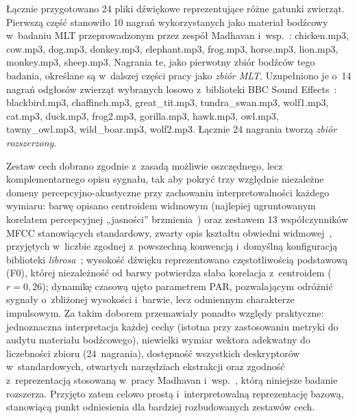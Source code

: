 \documentclass{article}
\begin{document}
Łącznie przygotowano 24 pliki dźwiękowe reprezentujące różne gatunki zwierząt. Pierwszą część stanowiło 10 nagrań wykorzystanych jako materiał bodźcowy w~badaniu MLT przeprowadzonym przez zespół Madhavan i~wsp.~\cite{MadhavanWrobel2024MLT}: chicken.mp3, cow.mp3, dog.mp3, donkey.mp3, elephant.mp3, frog.mp3, horse.mp3, lion.mp3, monkey.mp3, sheep.mp3. Nagrania te, jako pierwotny zbiór bodźców tego badania, określane są w~dalszej części pracy jako \textit{zbiór MLT}. Uzupełniono je o~14 nagrań odgłosów zwierząt wybranych losowo z~biblioteki BBC Sound Effects~\cite{bbcrewind_soundeffects}: blackbird.mp3, chaffinch.mp3, great\_tit.mp3, tundra\_swan.mp3, wolf1.mp3, cat.mp3, duck.mp3, frog2.mp3, gorilla.mp3, hawk.mp3, owl.mp3, tawny\_owl.mp3, wild\_boar.mp3, wolf2.mp3. Łącznie 24 nagrania tworzą \textit{zbiór rozszerzony}.

Zestaw cech dobrano zgodnie z~zasadą możliwie oszczędnego, lecz komplementarnego opisu sygnału, tak aby pokryć trzy względnie niezależne domeny percepcyjno-akustyczne przy zachowaniu interpretowalności każdego wymiaru: barwę opisano centroidem widmowym (najlepiej ugruntowanym korelatem percepcyjnej „jasności” brzmienia~\cite{Grey1977Timbre,Lakatos2000Timbre,saitis2020brightness}) oraz zestawem 13 współczynników MFCC stanowiących standardowy, zwarty opis kształtu obwiedni widmowej~\cite{Peeters2011TimbreToolbox,Siedenburg2017TimbreSimilarity,DeCamargo2017ProtaxSound}, przyjętych w~liczbie zgodnej z~powszechną konwencją i~domyślną konfiguracją biblioteki \textit{librosa}~\cite{mcfee2015librosa}; wysokość dźwięku reprezentowano częstotliwością podstawową (F0), której niezależność od barwy potwierdza słaba korelacja z~centroidem ($r = 0{,}26$); dynamikę czasową ujęto parametrem PAR, pozwalającym odróżnić sygnały o~zbliżonej wysokości i~barwie, lecz odmiennym charakterze impulsowym. Za takim doborem przemawiały ponadto względy praktyczne: jednoznaczna interpretacja każdej cechy (istotna przy zastosowaniu metryki do audytu materiału bodźcowego), niewielki wymiar wektora adekwatny do liczebności zbioru (24~nagrania), dostępność wszystkich deskryptorów w~standardowych, otwartych narzędziach ekstrakcji oraz zgodność z~reprezentacją stosowaną w~pracy Madhavan i~wsp.~\cite{MadhavanWrobel2024MLT}, którą niniejsze badanie rozszerza. Przyjęto zatem celowo prostą i~interpretowalną reprezentację bazową, stanowiącą punkt odniesienia dla bardziej rozbudowanych zestawów cech.
\end{document}
